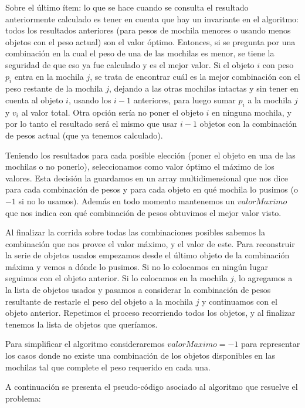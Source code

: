 Sobre el último ítem: lo que se hace cuando se consulta el resultado anteriormente calculado es tener en cuenta que hay un invariante en el algoritmo: todos los resultados anteriores (para pesos de mochila menores o usando menos objetos con el peso actual) son el valor óptimo. Entonces, si se pregunta por una combinación en la cual el peso de una de las mochilas es menor, se tiene la seguridad de que eso ya fue calculado y es el mejor valor. Si el objeto $i$ con peso $p_i$ entra en la mochila $j$, se trata de encontrar cuál es la mejor combinación con el peso restante de la mochila $j$, dejando a las otras mochilas intactas y sin tener en cuenta al objeto $i$, usando los $i-1$ anteriores, para luego sumar $p_i$ a la mochila $j$ y $v_i$ al valor total. Otra opción sería no poner el objeto $i$ en ninguna mochila, y por lo tanto el resultado será el mismo que usar $i-1$ objetos con la combinación de pesos actual (que ya tenemos calculado).

Teniendo los resultados para cada posible elección (poner el objeto en una de las mochilas o no ponerlo), seleccionamos como valor óptimo el máximo de los valores. Esta decisión la guardamos en un array multidimensional que nos dice para cada combinación de pesos y para cada objeto en qué mochila lo pusimos (o $-1$ si no lo usamos). Además en todo momento mantenemos un $valorMaximo$ que nos indica con qué combinación de pesos obtuvimos el mejor valor visto.

Al finalizar la corrida sobre todas las combinaciones posibles sabemos la combinación que nos provee el valor máximo, y el valor de este. Para reconstruir la serie de objetos usados empezamos desde el último objeto de la combinación máxima y vemos a dónde lo pusimos. Si no lo colocamos en ningún lugar seguimos con el objeto anterior. Si lo colocamos en la mochila $j$, lo agregamos a la lista de objetos usados y pasamos a considerar la combinación de pesos resultante de restarle el peso del objeto a la mochila $j$ y continuamos con el objeto anterior. Repetimos el proceso recorriendo todos los objetos, y al finalizar tenemos la lista de objetos que queríamos.

Para simplificar el algoritmo consideraremos $valorMaximo = -1$ para representar los casos donde no existe una combinación de los objetos disponibles en las mochilas tal que complete el peso requerido en cada una.

A continuación se presenta el pseudo-código asociado al algoritmo que resuelve el problema:

